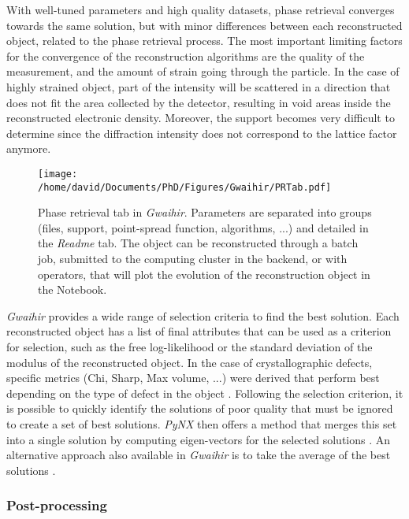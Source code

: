 With well-tuned parameters and high quality datasets, phase retrieval converges towards the same solution, but with minor differences between each reconstructed object, related to the phase retrieval process.
The most important limiting factors for the convergence of the reconstruction algorithms are the quality of the measurement, and the amount of strain going through the particle.
In the case of highly strained object, part of the intensity will be scattered in a direction that does not fit the area collected by the detector, resulting in void areas inside the reconstructed electronic density.
Moreover, the support becomes very difficult to determine since the diffraction intensity does not correspond to the lattice factor anymore.

\begin{figure}[!htb]
    \centering
    \texttt{[image: /home/david/Documents/PhD/Figures/Gwaihir/PRTab.pdf]}
    \caption{
    Phase retrieval tab in \textit{Gwaihir}.
    Parameters are separated into groups (files, support, point-spread function, algorithms, ...) and detailed in the \textit{Readme} tab.
    The object can be reconstructed through a batch job, submitted to the computing cluster in the backend, or with operators, that will plot the evolution of the reconstruction object in the Notebook.
    }
    \label{fig:PRT}
\end{figure}

\textit{Gwaihir} provides a wide range of selection criteria to find the best solution.
Each reconstructed object has a list of final attributes that can be used as a criterion for selection, such as the free log-likelihood \parencite{FavreNicolin2020a} or the standard deviation of the modulus of the reconstructed object.
In the case of crystallographic defects, specific metrics (Chi, Sharp, Max volume, ...) were derived that perform best depending on the type of defect in the object \parencite{Ulvestad2017}.
Following the selection criterion, it is possible to quickly identify the solutions of poor quality that must be ignored to create a set of best solutions.
\textit{PyNX} then offers a method that merges this set into a single solution by computing eigen-vectors for the selected solutions \parencite{FavreNicolin2020}.
An alternative approach also available in \textit{Gwaihir} is to take the average of the best solutions \parencite{Ulvestad2014}.

\subsubsection{Post-processing} \label{sec:postprocess}

